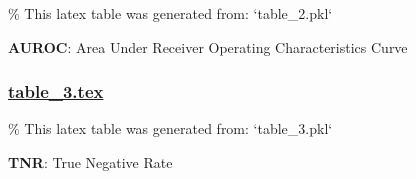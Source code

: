 \documentclass[11pt]{article}
\begin{document}
\begin{codeoutput}
\% This latex table was generated from: `table\_2.pkl`
\begin{table}[h]
\caption{ANOVA results comparing Area Under Receiver Operating Characteristic (AUROC) across algorithms}
\label{table:table\_2}
\begin{threeparttable}
\renewcommand{\TPTminimum}{\linewidth}
\begin{tablenotes}
\footnotesize
\item \textbf{AUROC}: Area Under Receiver Operating Characteristics Curve
\end{tablenotes}
\end{threeparttable}
\end{table}
\end{codeoutput}

\subsubsection*{\hyperlink{code-LaTeX Table Design-table-3-tex}{table\_3.tex}}

\begin{codeoutput}
\% This latex table was generated from: `table\_3.pkl`
\begin{table}[h]
\caption{Kruskal-Wallis results comparing True Negative Rate (TNR) across algorithms}
\label{table:table\_3}
\begin{threeparttable}
\renewcommand{\TPTminimum}{\linewidth}
\begin{tablenotes}
\footnotesize
\item \textbf{TNR}: True Negative Rate
\end{tablenotes}
\end{threeparttable}
\end{table}
\end{codeoutput}
\end{document}
